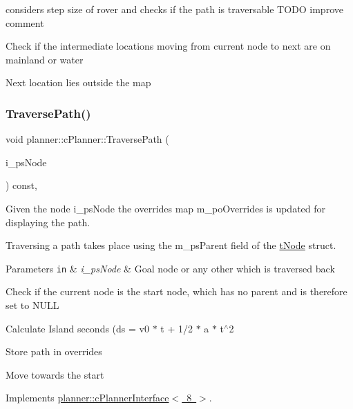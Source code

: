 considers step size of rover and checks if the path is traversable T\+O\+DO improve comment 

Check if the intermediate locations moving from current node to next are on mainland or water

Next location lies outside the map \mbox{\label{classplanner_1_1c_planner_ad9389067cbc3fa6fb1c2efdf3f344664}} 
\subsubsection{\texorpdfstring{Traverse\+Path()}{TraversePath()}}
{\footnotesize\ttfamily void planner\+::c\+Planner\+::\+Traverse\+Path (\begin{DoxyParamCaption}\item[{\mbox{\hyperlink{structplanner_1_1t_node}{t\+Node}} $\ast$}]{i\+\_\+ps\+Node }\end{DoxyParamCaption}) const\hspace{0.3cm}{\ttfamily [override]}, {\ttfamily [virtual]}}



Given the node i\+\_\+ps\+Node the overrides map m\+\_\+po\+Overrides is updated for displaying the path. 

Traversing a path takes place using the m\+\_\+ps\+Parent field of the \mbox{\hyperlink{structplanner_1_1t_node}{t\+Node}} struct. 
\begin{DoxyParams}[1]{Parameters}
\mbox{\tt in}  & {\em i\+\_\+ps\+Node} & Goal node or any other which is traversed back \\
\hline
\end{DoxyParams}
Check if the current node is the start node, which has no parent and is therefore set to N\+U\+LL

Calculate Island seconds (ds = v0 $\ast$ t + 1/2 $\ast$ a $\ast$ t$^\wedge$2

Store path in overrides

Move towards the start 

Implements \mbox{\hyperlink{classplanner_1_1c_planner_interface}{planner\+::c\+Planner\+Interface$<$ 8 $>$}}.

\mbox{\label{classplanner_1_1c_planner_a82e45fc2701e90d3fa9df72f475e455e}} 
